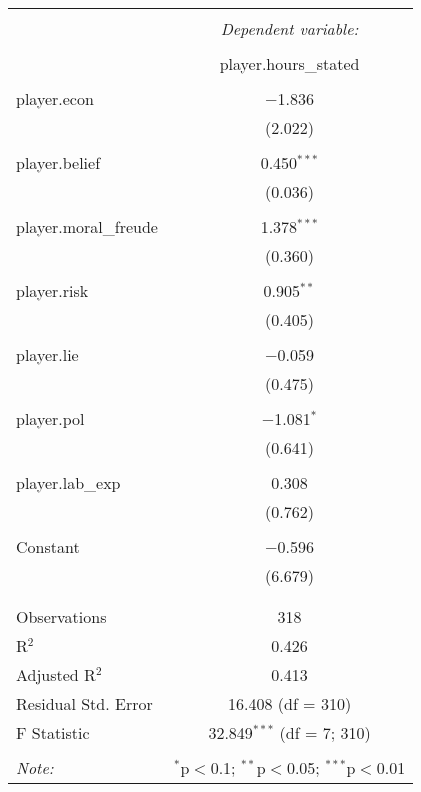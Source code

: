 
\begin{table}[!htbp] \centering 
  \caption{} 
  \label{} 
\begin{tabular}{@{\extracolsep{5pt}}lc} 
\\[-1.8ex]\hline 
\hline \\[-1.8ex] 
 & \multicolumn{1}{c}{\textit{Dependent variable:}} \\ 
\cline{2-2} 
\\[-1.8ex] & player.hours\_stated \\ 
\hline \\[-1.8ex] 
 player.econ & $-$1.836 \\ 
  & (2.022) \\ 
  & \\ 
 player.belief & 0.450$^{***}$ \\ 
  & (0.036) \\ 
  & \\ 
 player.moral\_freude & 1.378$^{***}$ \\ 
  & (0.360) \\ 
  & \\ 
 player.risk & 0.905$^{**}$ \\ 
  & (0.405) \\ 
  & \\ 
 player.lie & $-$0.059 \\ 
  & (0.475) \\ 
  & \\ 
 player.pol & $-$1.081$^{*}$ \\ 
  & (0.641) \\ 
  & \\ 
 player.lab\_exp & 0.308 \\ 
  & (0.762) \\ 
  & \\ 
 Constant & $-$0.596 \\ 
  & (6.679) \\ 
  & \\ 
\hline \\[-1.8ex] 
Observations & 318 \\ 
R$^{2}$ & 0.426 \\ 
Adjusted R$^{2}$ & 0.413 \\ 
Residual Std. Error & 16.408 (df = 310) \\ 
F Statistic & 32.849$^{***}$ (df = 7; 310) \\ 
\hline 
\hline \\[-1.8ex] 
\textit{Note:}  & \multicolumn{1}{r}{$^{*}$p$<$0.1; $^{**}$p$<$0.05; $^{***}$p$<$0.01} \\ 
\end{tabular} 
\end{table} 
